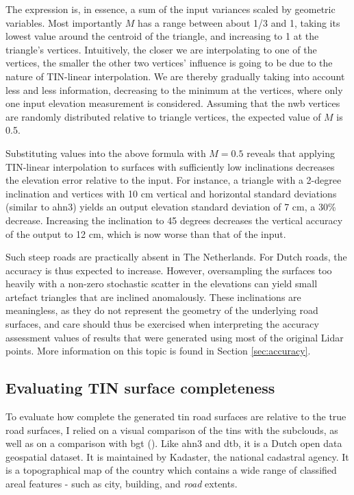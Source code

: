 The expression is, in essence, a sum of the input variances scaled by geometric variables. Most importantly $M$ has a range between about 1/3 and 1, taking its lowest value around the centroid of the triangle, and increasing to 1 at the triangle's vertices. Intuitively, the closer we are interpolating to one of the vertices, the smaller the other two vertices' influence is going to be due to the nature of TIN-linear interpolation. We are thereby gradually taking into account less and less information, decreasing to the minimum at the vertices, where only one input elevation measurement is considered. Assuming that the \ac{nwb} vertices are randomly distributed relative to triangle vertices, the expected value of $M$ is 0.5.

Substituting values into the above formula with $M=0.5$ reveals that applying TIN-linear interpolation to surfaces with sufficiently low inclinations decreases the elevation error relative to the input. For instance, a triangle with a 2-degree inclination and vertices with 10 cm vertical and horizontal standard deviations (similar to \ac{ahn3}) yields an output elevation standard deviation of 7 cm, a 30\% decrease. Increasing the inclination to 45 degrees decreases the vertical accuracy of the output to 12 cm, which is now worse than that of the input.

Such steep roads are practically absent in The Netherlands. For Dutch roads, the accuracy is thus expected to increase. However, oversampling the surfaces too heavily with a non-zero stochastic scatter in the elevations can yield small artefact triangles that are inclined anomalously. These inclinations are meaningless, as they do not represent the geometry of the underlying road surfaces, and care should thus be exercised when interpreting the accuracy assessment values of results that were generated using most of the original Lidar points. More information on this topic is found in Section \ref{sec:accuracy}.

\subsection{Evaluating TIN surface completeness}
\label{sub:m_accuracycompleteness}

To evaluate how complete the generated \ac{tin} road surfaces are relative to the true road surfaces, I relied on a visual comparison of the \ac{tin}s with the subclouds, as well as on a comparison with \ac{bgt} (\cite{bgt_homepage}). Like \ac{ahn3} and \ac{dtb}, it is a Dutch open data geospatial dataset. It is maintained by Kadaster, the national cadastral agency. It is a topographical map of the country which contains a wide range of classified areal features - such as city, building, and \textit{road} extents.

